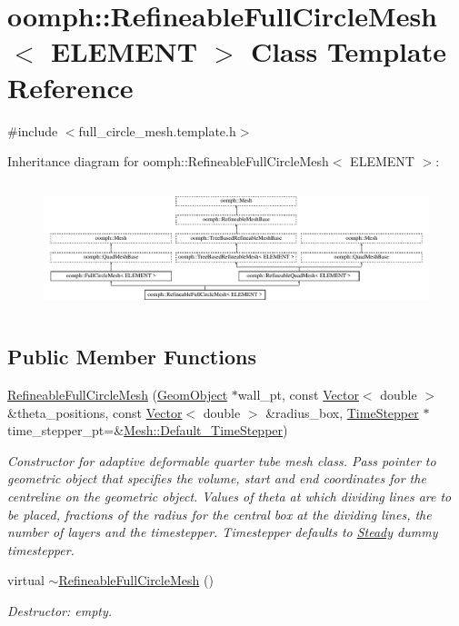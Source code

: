\hypertarget{classoomph_1_1RefineableFullCircleMesh}{}\section{oomph\+:\+:Refineable\+Full\+Circle\+Mesh$<$ E\+L\+E\+M\+E\+NT $>$ Class Template Reference}
\label{classoomph_1_1RefineableFullCircleMesh}


{\ttfamily \#include $<$full\+\_\+circle\+\_\+mesh.\+template.\+h$>$}

Inheritance diagram for oomph\+:\+:Refineable\+Full\+Circle\+Mesh$<$ E\+L\+E\+M\+E\+NT $>$\+:\begin{figure}[H]
\begin{center}
\leavevmode
\includegraphics[height=3.771044cm]{classoomph_1_1RefineableFullCircleMesh}
\end{center}
\end{figure}
\subsection*{Public Member Functions}
\begin{DoxyCompactItemize}
\item 
\hyperlink{classoomph_1_1RefineableFullCircleMesh_a08abf23ee7b1c7cc3082bcf8aa9fc8c9}{Refineable\+Full\+Circle\+Mesh} (\hyperlink{classoomph_1_1GeomObject}{Geom\+Object} $\ast$wall\+\_\+pt, const \hyperlink{classoomph_1_1Vector}{Vector}$<$ double $>$ \&theta\+\_\+positions, const \hyperlink{classoomph_1_1Vector}{Vector}$<$ double $>$ \&radius\+\_\+box, \hyperlink{classoomph_1_1TimeStepper}{Time\+Stepper} $\ast$time\+\_\+stepper\+\_\+pt=\&\hyperlink{classoomph_1_1Mesh_a12243d0fee2b1fcee729ee5a4777ea10}{Mesh\+::\+Default\+\_\+\+Time\+Stepper})
\begin{DoxyCompactList}\small\item\em Constructor for adaptive deformable quarter tube mesh class. Pass pointer to geometric object that specifies the volume, start and end coordinates for the centreline on the geometric object. Values of theta at which dividing lines are to be placed, fractions of the radius for the central box at the dividing lines, the number of layers and the timestepper. Timestepper defaults to \hyperlink{classoomph_1_1Steady}{Steady} dummy timestepper. \end{DoxyCompactList}\item 
virtual \hyperlink{classoomph_1_1RefineableFullCircleMesh_ac50b75d390504a37ecc8a86daebc78ee}{$\sim$\+Refineable\+Full\+Circle\+Mesh} ()
\begin{DoxyCompactList}\small\item\em Destructor\+: empty. \end{DoxyCompactList}\end{DoxyCompactItemize}
